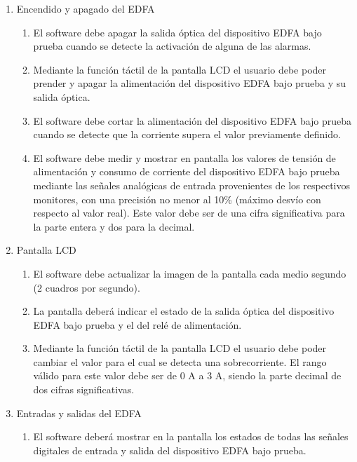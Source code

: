 \begin{enumerate}

\item Encendido y apagado del EDFA
	\begin{enumerate}
	\item El software debe apagar la salida óptica del dispositivo 			EDFA bajo prueba cuando se detecte la activación de alguna de las 		alarmas.
	\item Mediante la función táctil de la pantalla LCD el usuario 			debe poder prender y apagar la alimentación del dispositivo EDFA 		bajo prueba y su salida óptica.
	\item El software debe cortar la alimentación del dispositivo EDFA 	bajo prueba cuando se detecte que la corriente supera el valor 			previamente definido.
	\item El software debe medir y mostrar en pantalla los valores de 		tensión de alimentación y consumo de corriente del dispositivo 			EDFA bajo prueba mediante las señales analógicas de entrada 			provenientes de los respectivos monitores, con una precisión no 		menor al 10\% (máximo desvío con respecto al valor real). Este 			valor debe ser de una cifra significativa para la parte entera y 		dos para la decimal.
	\end{enumerate}

\item Pantalla LCD
	\begin{enumerate}
	\item El software debe actualizar la imagen de la pantalla cada 		medio segundo (2 cuadros por segundo).
	\item La pantalla deberá indicar el estado de la salida óptica del 	dispositivo EDFA bajo prueba y el del relé de alimentación.
	\item Mediante la función táctil de la pantalla LCD el usuario 			debe poder cambiar el valor para el cual se detecta una 				sobrecorriente. El rango válido para este valor debe ser de 0 A a 		3 A, siendo la parte decimal de dos cifras significativas.
	\end{enumerate}
	
\item Entradas y salidas del EDFA
	\begin{enumerate}
	\item El software deberá mostrar en la pantalla los estados de todas las señales digitales de entrada y salida del dispositivo EDFA bajo prueba.
	\end{enumerate}


\end{enumerate}
